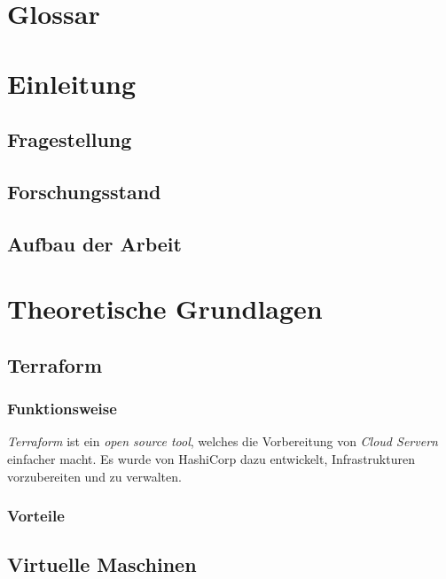 \documentclass[12pt,oneside]{article}
\begin{document}
\section*{Glossar} 
\begin{acronym}
 \acro{}{}
\end{acronym}
\clearpage
{}  
    \setcounter{page}{1}
\lhead{\nouppercase{\leftmark}}

\section{Einleitung} 
\subsection{Fragestellung}
\subsection{Forschungsstand}
\subsection{Aufbau der Arbeit}
\newpage

\section{Theoretische Grundlagen} 
\subsection{Terraform}
\subsubsection{Funktionsweise}
\textit{Terraform} ist ein \textit{open source tool}, welches die Vorbereitung von \textit{Cloud Servern} einfacher macht. Es wurde von HashiCorp dazu entwickelt, Infrastrukturen vorzubereiten und zu verwalten.
\subsubsection{Vorteile}
\subsection{Virtuelle Maschinen}
\end{document}
